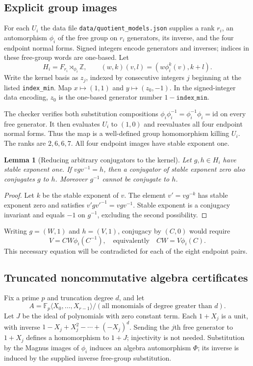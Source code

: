 \documentclass[11pt,a4paper]{article}
\newtheorem{lemma}[theorem]{Lemma}
\theoremstyle{definition}\newtheorem{definition}[theorem]{Definition}
\theoremstyle{remark}\newtheorem{remark}[theorem]{Remark}
\newcommand{\word}[1]{\texttt{#1}}
\newcommand{\pathfile}[1]{\nolinkurl{#1}}
\begin{document}
\subsection{Explicit group images}
For each $U_i$ the data file \pathfile{data/quotient_models.json} supplies a rank $r_i$, an automorphism $\phi_i$ of the free group on $r_i$ generators, its inverse, and the four endpoint normal forms. Signed integers encode generators and inverses; indices in these free-group words are one-based. Let
\[
 H_i=F_{r_i}\rtimes_{\phi_i}\mathbb Z,\qquad
 (w,k)(v,l)=(w\phi_i^k(v),k+l).
\]
Write the kernel basis as $z_j$, indexed by consecutive integers $j$ beginning at the listed \word{index\_min}. Map $x\mapsto(1,1)$ and $y\mapsto(z_0,-1)$. In the signed-integer data encoding, $z_0$ is the one-based generator number $1-\word{index\_min}$.

The checker verifies both substitution compositions $\phi_i\phi_i^{-1}=\phi_i^{-1}\phi_i=\mathrm{id}$ on every free generator. It then evaluates $U_i$ to $(1,0)$ and reevaluates all four endpoint normal forms. Thus the map is a well-defined group homomorphism killing $U_i$. The ranks are $2,6,6,7$. All four endpoint images have stable exponent one.

\begin{lemma}[Reducing arbitrary conjugators to the kernel]\label{lem:kernel}
Let $g,h\in H_i$ have stable exponent one. If $vgv^{-1}=h$, then a conjugator of stable exponent zero also conjugates $g$ to $h$. Moreover $g^{-1}$ cannot be conjugate to $h$.
\end{lemma}
\begin{proof}
Let $k$ be the stable exponent of $v$. The element $v'=vg^{-k}$ has stable exponent zero and satisfies $v'gv'^{-1}=vgv^{-1}$. Stable exponent is a conjugacy invariant and equals $-1$ on $g^{-1}$, excluding the second possibility.
\end{proof}

Writing $g=(W,1)$ and $h=(V,1)$, conjugacy by $(C,0)$ would require
\[
 V=CW\phi_i(C^{-1}),\quad\text{equivalently}\quad CW=V\phi_i(C).
\]
This necessary equation will be contradicted for each of the eight endpoint pairs.

\subsection{Truncated noncommutative algebra certificates}
Fix a prime $p$ and truncation degree $d$, and let
\[
 A=\mathbb F_p\langle X_0,\ldots,X_{r-1}\rangle/(
 \text{all monomials of degree greater than }d).
\]
Let $J$ be the ideal of polynomials with zero constant term. Each $1+X_j$ is a unit, with inverse $1-X_j+X_j^2-\cdots+(-X_j)^d$. Sending the $j$th free generator to $1+X_j$ defines a homomorphism to $1+J$; injectivity is not needed. Substitution by the Magnus images of $\phi_i$ induces an algebra automorphism $\Phi$; its inverse is induced by the supplied inverse free-group substitution.
\end{document}
